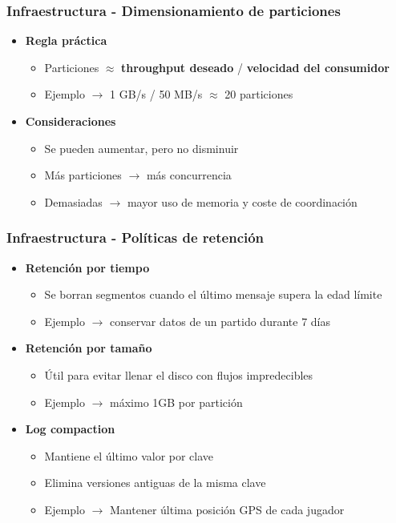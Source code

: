 \documentclass[aspectratio=169]{beamer}
\begin{document}
\begin{frame}\frametitle{Infraestructura - Dimensionamiento de particiones}
\begin{itemize}
  \item \textbf{Regla práctica}
  \begin{itemize}
    \item Particiones $\approx$ \textbf{throughput deseado} / \textbf{velocidad del consumidor}
    \item Ejemplo $\rightarrow$ 1 GB/s / 50 MB/s $\approx$ 20 particiones
  \end{itemize}
  \vspace{1em}

  \item \textbf{Consideraciones}
  \begin{itemize}
    \item Se pueden aumentar, pero no disminuir
    \item Más particiones $\rightarrow$ más concurrencia
    \item Demasiadas $\rightarrow$ mayor uso de memoria y coste de coordinación
  \end{itemize}
\end{itemize}
\end{frame}

\begin{frame}\frametitle{Infraestructura - Políticas de retención}
\begin{itemize}
  \item \textbf{Retención por tiempo}
  \begin{itemize}
    \item Se borran segmentos cuando el último mensaje supera la edad límite
    \item Ejemplo $\rightarrow$ conservar datos de un partido durante 7 días
  \end{itemize}

  \vspace{1em}

  \item \textbf{Retención por tamaño}
  \begin{itemize}
    \item Útil para evitar llenar el disco con flujos impredecibles
    \item Ejemplo $\rightarrow$ máximo 1GB por partición
  \end{itemize}

  \vspace{1em}

  \item \textbf{Log compaction}
  \begin{itemize}
    \item Mantiene el último valor por clave
    \item Elimina versiones antiguas de la misma clave
    \item Ejemplo $\rightarrow$ Mantener última posición GPS de cada jugador
  \end{itemize}
\end{itemize}
\end{frame}
\end{document}
